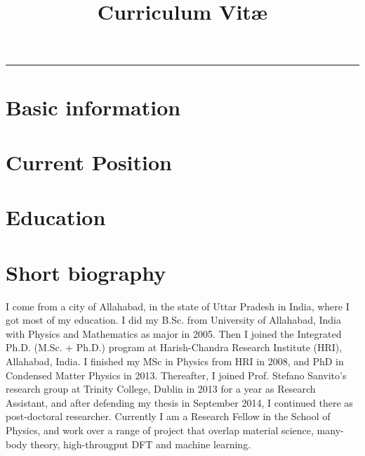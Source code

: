 \documentclass[10pt,a4paper,sans]{moderncv}        %
\title{Curriculum Vit\ae}                               %
\begin{document}
\makecvtitle
\vspace{-0.9cm}
\hrule
\section{Basic information}

\section{Current Position}

\section{Education}

\vspace{0.3cm}

\section{Short biography}
I come from a city of Allahabad, in the state of Uttar Pradesh in India, where I got most of my education.
I did my B.Sc. from University of Allahabad, India with Physics and Mathematics as major in 2005.
Then I joined the Integrated Ph.D. (M.Sc. + Ph.D.) program at Harish-Chandra Research Institute (HRI),
Allahabad, India. I finished my MSc in Physics from HRI in 2008, and PhD in Condensed Matter Physics in 2013.
Thereafter, I joined Prof. Stefano Sanvito's research group at Trinity College, Dublin in 2013
for a year as Research Assistant, and after defending my thesis in September 2014, I continued there as
post-doctoral researcher. Currently I am a Research Fellow in the School of Physics, and work over a range of
project that overlap material science, many-body theory, high-througput DFT and machine learning.
\end{document}

